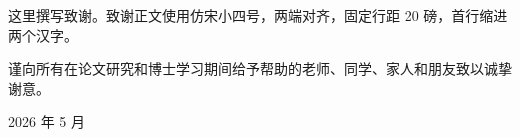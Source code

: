 \begin{acknowledgements}
这里撰写致谢。致谢正文使用仿宋小四号，两端对齐，固定行距 20 磅，首行缩进两个汉字。

谨向所有在论文研究和博士学习期间给予帮助的老师、同学、家人和朋友致以诚挚谢意。

\vspace{2cm}
\begin{flushright}
2026 年 5 月
\end{flushright}
\end{acknowledgements}
